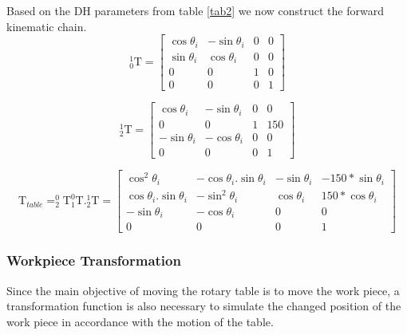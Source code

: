 Based on the DH parameters from table \ref{tab2} we now construct the forward kinematic chain. 
\begin{equation}
\label{eq20}
_{0}^{1}\textrm{T} = \begin{bmatrix} \cos\theta_{i} & -\sin \theta_{i} & 0 & 0\\ \sin \theta_{i} & \cos \theta_{i} & 0 & 0\\ 0 & 0 & 1 & 0\\ 0 & 0 & 0 & 1 \end{bmatrix}
\end{equation}

\begin{equation}
\label{eq21}
_{2}^{1}\textrm{T} = \begin{bmatrix} \cos\theta_{i} & -\sin \theta_{i} & 0 & 0\\ 0 & 0 & 1 & 150\\ -\sin \theta_{i} & -\cos\theta_{i} & 0 & 0\\ 0 & 0 & 0 & 1 \end{bmatrix}
\end{equation}

\begin{equation}
\label{eq22}
\textrm{T}_{table} =_{2}^{0}\textrm{T}_{1}^{0}\textrm{T}._{2}^{1}\textrm{T} = \begin{bmatrix} \cos^{2}\theta_{i}& -\cos\theta_{i}.\sin\theta_{i} & -\sin\theta_{i} & -150*\sin\theta_{i}\\ \cos\theta_{i}.\sin\theta_{i} & -\sin^{2}\theta_{i} & \cos\theta_{i} & 150*\cos\theta_{i}\\ -\sin\theta_{i} & -\cos\theta_{i}& 0 & 0\\ 0& 0& 0& 1\end{bmatrix}
\end{equation}

\subsubsection{Workpiece Transformation}

Since the main objective of moving the rotary table is to move the work piece, a transformation function is also necessary to simulate the changed position of the work piece in accordance with the motion of the table. 

